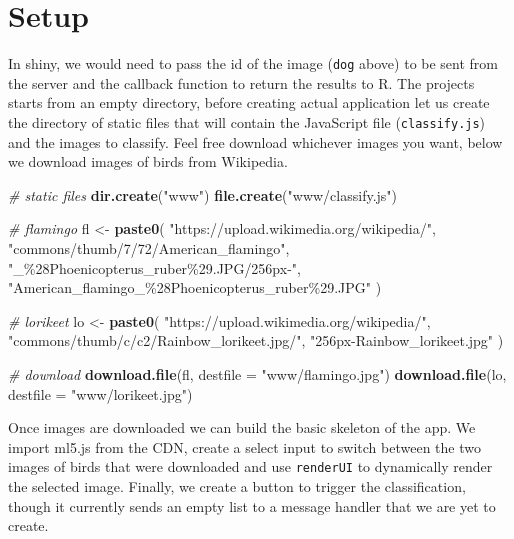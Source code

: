 \documentclass[
]{krantz}
\makeatletter
\newenvironment{Shaded}{\begin{snugshade}}{\end{snugshade}}
\newcommand{\CommentTok}[1]{\textcolor[rgb]{0.37,0.37,0.37}{\textit{#1}}}
\newcommand{\DataTypeTok}[1]{\textcolor[rgb]{0.27,0.27,0.27}{#1}}
\newcommand{\KeywordTok}[1]{\textcolor[rgb]{0.27,0.27,0.27}{\textbf{#1}}}
\newcommand{\NormalTok}[1]{#1}
\newcommand{\StringTok}[1]{\textcolor[rgb]{0.5,0.5,0.5}{#1}}
\newenvironment{kframe}{%
\medskip{}
\setlength{\fboxsep}{.8em}
 \def\at@end@of@kframe{}%
 \ifinner\ifhmode%
  \def\at@end@of@kframe{\end{minipage}}%
  \begin{minipage}{\columnwidth}%
 \fi\fi%
 \def\FrameCommand##1{\hskip\@totalleftmargin \hskip-\fboxsep
 \colorbox{shadecolor}{##1}\hskip-\fboxsep
     \hskip-\linewidth \hskip-\@totalleftmargin \hskip\columnwidth}%
 \MakeFramed {\advance\hsize-\width
   \@totalleftmargin\z@ \linewidth\hsize
   \@setminipage}}%
 {\par\unskip\endMakeFramed%
 \at@end@of@kframe}
\renewenvironment{Shaded}{\begin{kframe}}{\end{kframe}}
\makeatother
\begin{document}
\hypertarget{v8-img-setup}{%
\section{Setup}\label{v8-img-setup}}

In shiny, we would need to pass the id of the image (\texttt{dog} above) to be sent from the server and the callback function to return the results to R. The projects starts from an empty directory, before creating actual application let us create the directory of static files that will contain the JavaScript file (\texttt{classify.js}) and the images to classify. Feel free download whichever images you want, below we download images of birds from Wikipedia.

\begin{Shaded}
\begin{Highlighting}[]
\CommentTok{\# static files}
\KeywordTok{dir.create}\NormalTok{(}\StringTok{"www"}\NormalTok{)}
\KeywordTok{file.create}\NormalTok{(}\StringTok{"www/classify.js"}\NormalTok{)}

\CommentTok{\# flamingo}
\NormalTok{fl <{-}}\StringTok{ }\KeywordTok{paste0}\NormalTok{(}
  \StringTok{"https://upload.wikimedia.org/wikipedia/"}\NormalTok{,}
  \StringTok{"commons/thumb/7/72/American\_flamingo"}\NormalTok{,}
  \StringTok{"\_\%28Phoenicopterus\_ruber\%29.JPG/256px{-}"}\NormalTok{,}
  \StringTok{"American\_flamingo\_\%28Phoenicopterus\_ruber\%29.JPG"}
\NormalTok{)}

\CommentTok{\# lorikeet}
\NormalTok{lo <{-}}\StringTok{ }\KeywordTok{paste0}\NormalTok{(}
  \StringTok{"https://upload.wikimedia.org/wikipedia/"}\NormalTok{,}
  \StringTok{"commons/thumb/c/c2/Rainbow\_lorikeet.jpg/"}\NormalTok{,}
  \StringTok{"256px{-}Rainbow\_lorikeet.jpg"}
\NormalTok{)}

\CommentTok{\# download}
\KeywordTok{download.file}\NormalTok{(fl, }\DataTypeTok{destfile =} \StringTok{"www/flamingo.jpg"}\NormalTok{)}
\KeywordTok{download.file}\NormalTok{(lo, }\DataTypeTok{destfile =} \StringTok{"www/lorikeet.jpg"}\NormalTok{)}
\end{Highlighting}
\end{Shaded}

Once images are downloaded we can build the basic skeleton of the app. We import ml5.js from the CDN, create a select input to switch between the two images of birds that were downloaded and use \texttt{renderUI} to dynamically render the selected image. Finally, we create a button to trigger the classification, though it currently sends an empty list to a message handler that we are yet to create.
\end{document}
